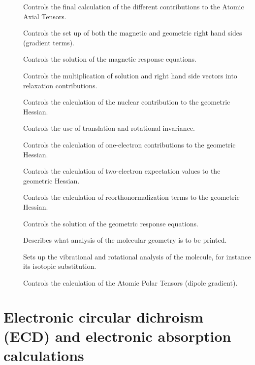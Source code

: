 \begin{description}
\item[] Controls the final calculation of the different
contributions to the Atomic Axial Tensors.
\item[] Controls the set up of both the magnetic and
geometric right hand sides (gradient terms).
\item[] Controls the solution of the magnetic response
equations.
\item[] Controls the multiplication of solution and right hand
side vectors into relaxation contributions.
\item[] Controls the calculation of the nuclear
contribution to the geometric Hessian.
\item[] Controls the use of translation and rotational invariance.
\item[] Controls the calculation of one-electron
contributions to the geometric Hessian.
\item[] Controls the calculation of two-electron
expectation values to the geometric Hessian.
\item[] Controls the calculation of reorthonormalization
terms to the geometric Hessian.
\item[] Controls the solution of the geometric response equations.
\item[] Describes what analysis of the molecular geometry
is to be printed.
\item[] Sets up the vibrational and rotational analysis of the
molecule, for instance its isotopic substitution.
\item[] Controls the calculation of the Atomic Polar
Tensors (dipole gradient).
\end{description}

\section{Electronic circular dichroism (ECD) and electronic absorption
calculations}\label{sec:ecd} 

\begin{center}
\end{center}

